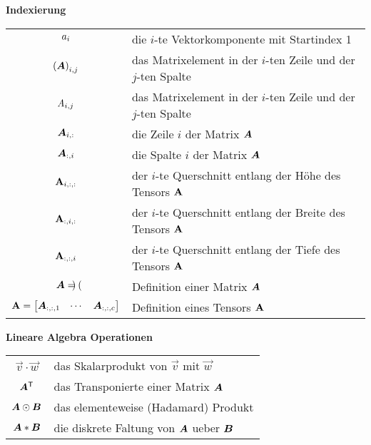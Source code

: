 \begin{center}\textbf{Indexierung}\end{center}
\begin{tabular}{cl}
  $a_i$ & die $i$-te Vektorkomponente mit Startindex 1 \\
  ${(\bm{A})}_{i,j}$ & das Matrixelement in der $i$-ten Zeile und der $j$-ten Spalte \\
  $\mathit{A}_{i,j}$ & das Matrixelement in der $i$-ten Zeile und der $j$-ten Spalte \\
  $\bm{A}_{i,:}$ & die Zeile $i$ der Matrix $\bm{A}$ \\
  $\bm{A}_{:,i}$ & die Spalte $i$ der Matrix $\bm{A}$\ \\
  $\mathbf{A}_{i,:,:}$ & der $i$-te Querschnitt entlang der Höhe des Tensors $\mathbf{A}$ \\
  $\mathbf{A}_{:,i,:}$ & der $i$-te Querschnitt entlang der Breite des Tensors $\mathbf{A}$ \\
  $\mathbf{A}_{:,:,i}$ & der $i$-te Querschnitt entlang der Tiefe des Tensors $\mathbf{A}$ \\
  $\bm{A} = \begin{pmatrix} \end{pmatrix}$ & Definition einer Matrix $\bm{A}$ \\
  $\mathbf{A} = \begin{bmatrix} \bm{A}_{:,:,1} & \cdots & \bm{A}_{:,:,c} \end{bmatrix}$ & Definition eines Tensors $\mathbf{A}$ \\

\end{tabular}

\begin{center}\textbf{Lineare Algebra Operationen}\end{center}
\begin{tabular}{cl}
  $\vec{v} \cdot \vec{w}$ & das Skalarprodukt von $\vec{v}$ mit $\vec{w}$ \\
  $\bm{A}^{\mathsf{T}}$ & das Transponierte einer Matrix $\bm{A}$ \\
  $\bm{A} \odot \bm{B}$ & das elementeweise (Hadamard) Produkt \\
  $\bm{A} * \bm{B}$ & die diskrete Faltung von $\bm{A}$ ueber $\bm{B}$

\end{tabular}

